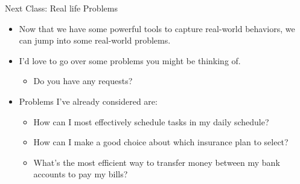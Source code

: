 \documentclass[10pt, aspectratio=169]{beamer}
\begin{document}
\begin{frame}{Next Class: Real life Problems}
    \begin{itemize}
        \item Now that we have some powerful tools to capture real-world behaviors, we can jump into some real-world problems.
        \item I'd love to go over some problems you might be thinking of.
        \begin{itemize}
            \item Do you have any requests?
        \end{itemize}
        \item Problems I've already considered are:
        \begin{itemize}
            \item How can I most effectively schedule tasks in my daily schedule?
            \item How can I make a good choice about which insurance plan to select?
            \item What's the most efficient way to transfer money between my bank accounts to pay my bills?
        \end{itemize}
    \end{itemize}
\end{frame}
\end{document}
